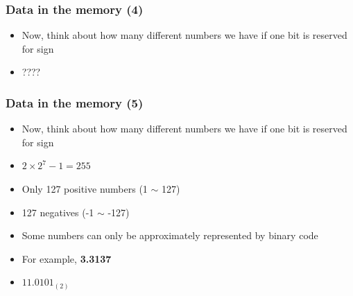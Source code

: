 \begin{frame}
	\frametitle{Data in the memory (4)}
	\begin{itemize}
		\item {Now, think about how many different numbers we have if one bit is reserved for sign}
		\item {????}
	\end{itemize}
\end{frame}

\begin{frame}
	\frametitle{Data in the memory (5)}
	\begin{itemize}
		\item {Now, think about how many different numbers we have if one bit is reserved for sign}
		\item {$2{\times}2^7-1=255$}
		\item {Only 127 positive numbers (1 $\sim$ 127)}
		\item {127 negatives (-1 $\sim$ -127)}
	\end{itemize}
	\begin{itemize}
		\item {Some numbers can only be approximately represented by binary code}
		\item {For example, \textbf{3.3137}}
		\item {$11.0101_{(2)}$}
	\end{itemize}
\end{frame}

